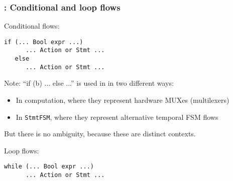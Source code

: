 \begin{frame}[fragile]
\frametitle{{\BSV}: Conditional and loop flows}

\footnotesize

Conditional flows:
\begin{Verbatim}[frame=single]
   if (... Bool expr ...)
      ... Action or Stmt ...
   else
      ... Action or Stmt ...
\end{Verbatim}

\vspace{2ex}

Note: ``if (b) ... else ...'' is used in {\BSV} in two different ways:

\begin{itemize}
 \item In computation, where they represent hardware MUXes (multilexers)
 \item In {\tt StmtFSM}, where they represent alternative temporal FSM flows
\end{itemize}

But there is no ambiguity, because these are distinct contexts.

\PAUSE{\vspace{5ex}}

Loop flows:
\begin{Verbatim}[frame=single]
   while (... Bool expr ...)
      ... Action or Stmt ...
\end{Verbatim}

\end{frame}


